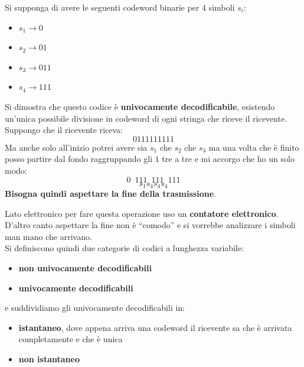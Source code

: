 \documentclass[a4paper,12pt, oneside]{book}
\begin{document}
\begin{esempio}
  Si supponga di avere le seguenti codeword binarie per 4 simboli $s_i$:
  \begin{itemize}
    \item $s_1\to 0$
    \item $s_2\to 01$
    \item $s_3\to 011$
    \item $s_4\to 111$
  \end{itemize}
  Si dimostra che questo codice è \textbf{univocamente decodificabile},
  esistendo un'unica possibile divisione in codeword di ogni stringa che riceve
  il ricevente.\\
  Suppongo che il ricevente riceva:
  \[0111111111\]
  Ma anche solo all'inizio potrei avere sia $s_1$ che $s_2$ che $s_3$ ma una
  volta che è finito posso partire dal fondo raggruppando gli $1$ tre a tre e mi
  accorgo che ho un solo modo:
  \[0\,\,\,111\,\,\,111\,\,\,111\]
  \[s_1s_4s_4s_4\]
  \textbf{Bisogna quindi aspettare la fine della trasmissione}.
\end{esempio}
Lato elettronico per fare questa operazione uso un \textbf{contatore
  elettronico}.\\
D'altro canto aspettare la fine non è ``comodo'' e si vorrebbe analizzare i
simboli man mano che arrivano.\\
Si definiscono quindi due categorie di codici a lunghezza variabile:
\begin{itemize}
  \item \textbf{non univocamente decodificabili}
  \item \textbf{univocamente decodificabili}
\end{itemize}
e suddividiamo gli univocamente decodificabili in:
\begin{itemize}
  \item \textbf{istantaneo}, dove appena arriva una codeword il ricevente sa che
  è arrivata completamente e che è unica
  \item \textbf{non istantaneo}
\end{itemize}
\end{document}
